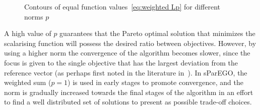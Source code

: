 \documentclass[a4paper]{article}
\begin{document}
\begin{figure}%
\centering
{}
\caption{Contours of equal function values~\eqref{eq:weighted Lp} for different norms $p$}
\label{fig:weightedLp}
\end{figure}

A high value of $p$ guarantees that the Pareto optimal solution that minimizes the scalarising function will possess the desired ratio between objectives. However, by using a higher norm the convergence of the algorithm becomes slower, since the focus is given to the single objective that has the largest deviation from the reference vector (as perhaps first noted in the literature in~\cite{borges1998basis}). In sParEGO, the weighted sum ($p=1$) is used in early stages to promote convergence, and the norm is gradually increased towards the final stages of the algorithm in an effort to find a well distributed set of solutions to present as possible trade-off choices.
\end{document}

